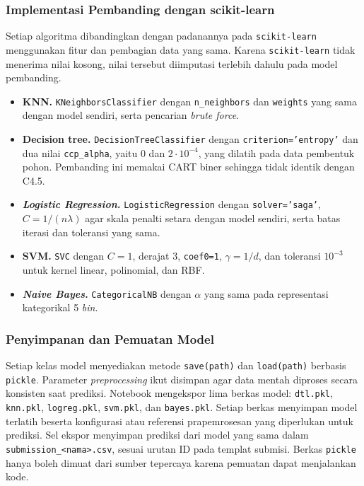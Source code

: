 \subsubsection{Implementasi Pembanding dengan scikit-learn}

Setiap algoritma dibandingkan dengan padanannya pada \texttt{scikit-learn}
\cite{ref:pedregosa-2011} menggunakan fitur dan pembagian data yang sama.
Karena \texttt{scikit-learn} tidak menerima nilai kosong, nilai tersebut
diimputasi terlebih dahulu pada model pembanding.

\begin{itemize}
    \item \textbf{KNN.} \texttt{KNeighbors\allowbreak Classifier} dengan
        \texttt{n\_\allowbreak neighbors} dan \texttt{weights} yang sama dengan
        model sendiri, serta pencarian \textit{brute force}.
    \item \textbf{Decision tree.} \texttt{DecisionTreeClassifier} dengan
        \texttt{criterion='entropy'} dan dua nilai \texttt{ccp\_alpha}, yaitu
        $0$ dan $2\cdot 10^{-4}$, yang dilatih pada data pembentuk pohon.
        Pembanding ini memakai CART biner sehingga tidak identik dengan C4.5.
    \item \textbf{\textit{Logistic Regression}.} \texttt{LogisticRegression}
        dengan \texttt{solver='saga'}, $C=1/(n\lambda)$ agar skala penalti
        setara dengan model sendiri, serta batas iterasi dan toleransi yang sama.
    \item \textbf{SVM.} \texttt{SVC} dengan $C=1$, derajat 3, \texttt{coef0=1},
        $\gamma=1/d$, dan toleransi $10^{-3}$ untuk kernel linear, polinomial,
        dan RBF.
    \item \textbf{\textit{Naive Bayes}.} \texttt{CategoricalNB} dengan $\alpha$
        yang sama pada representasi kategorikal 5 \textit{bin}.
\end{itemize}

\subsubsection{Penyimpanan dan Pemuatan Model}

Setiap kelas model menyediakan metode \texttt{save(path)} dan
\texttt{load(path)} berbasis \texttt{pickle}. Parameter \textit{preprocessing}
ikut disimpan agar data mentah diproses secara konsisten saat prediksi.
Notebook mengekspor lima berkas model: \texttt{dtl.pkl}, \texttt{knn.pkl},
\texttt{logreg.pkl}, \texttt{svm.pkl}, dan \texttt{bayes.pkl}. Setiap berkas
menyimpan model terlatih beserta konfigurasi atau referensi prapemrosesan
yang diperlukan untuk prediksi. Sel ekspor menyimpan prediksi dari model
yang sama dalam \texttt{submission\_<nama>.csv}, sesuai urutan ID pada
templat submisi. Berkas \texttt{pickle} hanya boleh dimuat dari sumber
tepercaya karena pemuatan dapat menjalankan kode.


